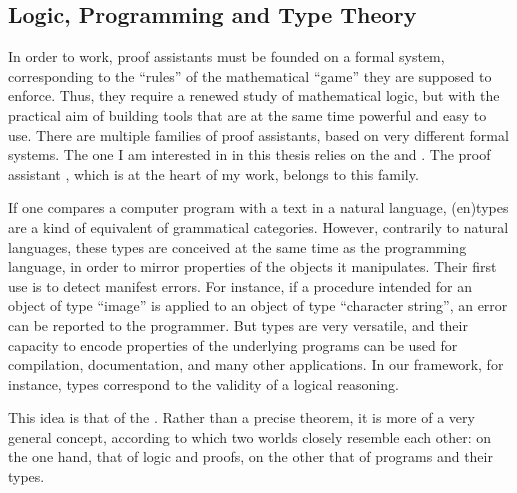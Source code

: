 \subsection{Logic, Programming and Type Theory}

In order to work, proof assistants must be founded on a formal system, corresponding to
the “rules” of the mathematical “game” they are supposed to enforce.
Thus, they require a renewed study of mathematical logic, but with the practical aim of
building tools that are at the same time powerful and easy to use.
There are multiple families of proof assistants, based on very different formal systems.
The one I am interested in in this thesis relies on the 
and . The proof assistant 
, which is at the heart of my work, belongs to this family.

If one compares a computer program with a text in a natural language,
\intro(en){types}
are a kind of equivalent of grammatical categories. However, contrarily to natural
languages, these types are conceived at the same time as the programming language, in order
to mirror properties of the objects it manipulates.
Their first use is to detect manifest errors. For instance, if a procedure
intended for an object of type “image” is applied to an object of type “character string”,
an error can be reported to the programmer.%
%
But types are very versatile, and their capacity to encode properties of the underlying
programs can be used for compilation, documentation, and many other applications. In our
framework, for instance, types correspond to the validity of a logical reasoning.

This idea is that of the .%
%
%
Rather than a precise theorem,
it is more of a very general concept, according to which two worlds closely resemble each
other: on the one hand, that of logic and proofs, on the other that of programs
and their types.

